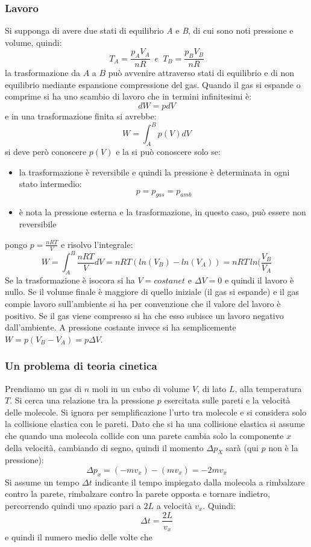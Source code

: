 \documentclass[a4paper,12pt, oneside]{book}
\begin{document}
\subsubsection{Lavoro}
Si supponga di avere due stati di equilibrio \textit{A} e \textit{B}, di cui sono noti pressione e volume, quindi:
$$T_A=\frac{p_AV_A}{nR}\,\,\,e\,\,\,T_B=\frac{p_BV_B}{nR}$$ 
la trasformazione da $A$ a $B$ può avvenire attraverso stati di equilibrio e di non equilibrio mediante espansione compressione del gas. Quando il gas si espande o comprime si ha uno scambio di lavoro che in termini infinitesimi è:
$$dW=pdV$$
e in una trasformazione finita si avrebbe:
$$W=\int_A^B p(V)dV$$
si deve però conoscere $p(V)$ e la si può conoscere solo se:
\begin{itemize}
\item la trasformazione è reversibile e quindi la pressione è determinata in ogni stato intermedio:
$$p=p_{gas}=p_{amb}$$
\item è nota la pressione esterna e la trasformazione, in questo caso, può essere non reversibile
\end{itemize}
pongo $p=\frac{nRT}{V}$ e risolvo l'integrale:
$$W=\int_A^B \frac{nRT}{V}dV=nRT(ln(V_B)-ln(V_A))=nRT\,ln(\frac{V_B}{V_A}$$
Se la trasformazione è isocora si ha $V=costanet$ e $\Delta V=0$ e quindi il lavoro è nullo. Se il volume finale è maggiore di quello iniziale (il gas si espande) e il gas compie lavoro sull'ambiente si ha per convenzione che il valore del lavoro è positivo. Se il gas viene compresso si ha che esso subisce un lavoro negativo dall'ambiente. A pressione costante invece si ha semplicemente $W=p(V_B-V_A)=p\Delta V$.

\subsubsection{Un problema di teoria cinetica}
Prendiamo un gas di $n$ moli in un cubo di volume $V$, di lato $L$, alla temperatura $T$. Si cerca una relazione tra la pressione $p$ esercitata sulle pareti e la velocità delle molecole. Si ignora per semplificazione l'urto tra molecole e si considera solo la collisione elastica con le pareti. Dato che si ha una collisione elastica si assume che quando una molecola collide con una parete cambia solo la componente $x$ della velocità, cambiando di segno, quindi il momento $\Delta p_X$ sarà (qui $p$ non è la pressione):
$$\Delta p_x=(-mv_x)-(mv_x)=-2mv_x$$
Si assume un tempo $\Delta t$ indicante il tempo impiegato dalla molecola a rimbalzare contro la parete, rimbalzare contro la parete opposta e tornare indietro, percorrendo quindi uno spazio pari a $2L$ a velocità $v_x$. Quindi:
$$\Delta t=\frac{2L}{v_x}$$
e quindi il numero medio delle volte che 
\end{document}
